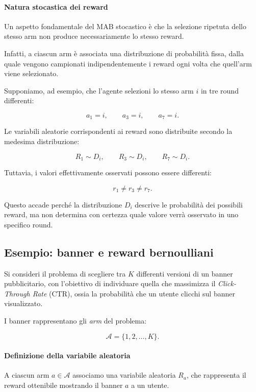\paragraph{Natura stocastica dei reward}

Un aspetto fondamentale del MAB stocastico è che la selezione ripetuta dello stesso arm non produce necessariamente lo stesso reward.

Infatti, a ciascun arm è associata una distribuzione di probabilità fissa, dalla quale vengono campionati indipendentemente i reward ogni volta che quell'arm viene selezionato.

Supponiamo, ad esempio, che l'agente selezioni lo stesso arm $i$ in tre round differenti:

\[
a_1=i, \qquad a_3=i, \qquad a_7=i.
\]

Le variabili aleatorie corrispondenti ai reward sono distribuite secondo la medesima distribuzione:

\[
R_1 \sim D_i, \qquad
R_3 \sim D_i, \qquad
R_7 \sim D_i.
\]

Tuttavia, i valori effettivamente osservati possono essere differenti:

\[
r_1 \neq r_3 \neq r_7.
\]

Questo accade perché la distribuzione $D_i$ descrive le probabilità dei possibili reward, ma non determina con certezza quale valore verrà osservato in uno specifico round.



\subsection{Esempio: banner e reward bernoulliani}

Si consideri il problema di scegliere tra $K$ differenti versioni di un banner pubblicitario, con l'obiettivo di individuare quella che massimizza il \textit{Click-Through Rate} (CTR), ossia la probabilità che un utente clicchi sul banner visualizzato.

I banner rappresentano gli \textit{arm} del problema:

\[
\mathcal{A} = \{1,2,\ldots,K\}.
\]

\paragraph{Definizione della variabile aleatoria}

A ciascun arm $a \in \mathcal{A}$ associamo una variabile aleatoria $R_a$, che rappresenta il reward ottenibile mostrando il banner $a$ a un utente.

